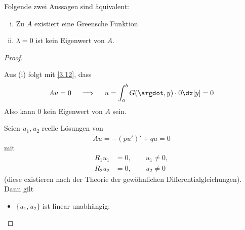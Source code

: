 \begin{st} \label{3.14}
	Folgende zwei Aussagen sind äquivalent:
	\begin{enumerate}[(i)]
		\item
			Zu $A$ existiert eine Greensche Funktion
		\item
			$\lambda = 0$ ist kein Eigenwert von $A$.
	\end{enumerate}
	\begin{proof}
		\begin{seg}[(i)$\implies$(ii)]
			Aus (i) folgt mit \ref{3.12}, dass
			\[
				Au = 0 \quad\implies\quad u = \int_a^b G(\argdot,y) \cdot 0 \dx[y] = 0
			\]
			Also kann $0$ kein Eigenwert von $A$ sein.
		\end{seg}
		\begin{seg}[(ii)$\implies$(i)]
			Seien $u_1,u_2$ reelle Lösungen von
			\[
				\tilde A u = -(pu')' + qu = 0
			\]
			mit
			\begin{align*}
				R_1u_1 &= 0, \qquad u_1 \neq 0, \\
				R_2u_2 &= 0, \qquad u_2 \neq 0
			\end{align*}
			(diese existieren nach der Theorie der gewöhnlichen Differentialgleichungen).
			Dann gilt
			\begin{itemize}
				\item
					$\{u_1,u_2\}$ ist linear unabhängig:


\end{itemize}
\end{seg}
\end{proof}
\end{st}
